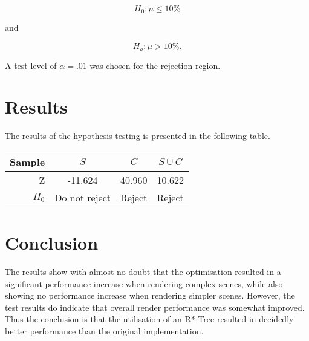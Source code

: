 \documentclass[a4paper]{article}
\begin{document}
$$ H_0: \mu \leq 10\% $$
\begin{center}
  and
\end{center}
$$ H_a: \mu > 10\%. $$

A test level of $\alpha = .01$ was chosen for the rejection region.

\section{Results}

The results of the hypothesis testing is presented in the following table.

\begin{center}
  \begin{tabular}{ | r || c | c | c | }
    \hline
    Sample  & $S$           & $C$    & $S \cup C$ \\ \hline \hline
    Z       & -11.624       & 40.960 & 10.622     \\ \hline
    $H_0$   & Do not reject & Reject & Reject     \\
    \hline
  \end{tabular}
\end{center}

\section{Conclusion}

The results show with almost no doubt that the optimisation resulted in a significant performance increase when rendering complex scenes, while also showing no performance increase when rendering simpler scenes. However, the test results do indicate that overall render performance was somewhat improved. Thus the conclusion is that the utilisation of an R*-Tree resulted in decidedly better performance than the original implementation.
\end{document}
